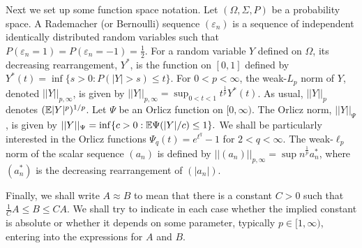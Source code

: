 Next we set up some function space notation. Let $(\Omega,\Sigma,P)$ be
a probability space. A Rademacher (or Bernoulli) sequence $(\varepsilon_n)$ is
a sequence of independent identically distributed random variables such that
$P(\varepsilon_n = 1)= P(\varepsilon_n = -1) = \frac12$. For a random variable
$Y$ defined on $\Omega$, its decreasing rearrangement, $Y^*$, is the function on
$[0,1]$ defined by $Y^*(t)= \inf \lbrace s>0 : P(|Y|>s) \le t \rbrace$.
For $0<p<\infty$, the weak-$L_p$ norm of $Y$, denoted $||Y||_{p,\infty}$, is
 given by
$||Y||_{p,\infty} = \sup_{0<t<1}t^{\frac 1p}Y^*(t)$. As usual, $||Y||_p$
denotes $(\Bbb E |Y|^p)^{1/p}$.
Let $\Psi$ be an Orlicz function on $[0,\infty)$. The Orlicz norm, $||Y||_\Psi$
, is given by $||Y||_\Psi = \inf \lbrace c>0: \Bbb E \Psi(|Y|/c) \le 1 \rbrace.$
 We shall be particularly interested in the Orlicz functions
 $\Psi_q(t)=e^{t^q}-1$ for $2<q<\infty$. The weak-$\ell_p$ norm of the scalar
 sequence $(a_n)$ is
defined by $||(a_n)||_{p,\infty}= \sup n^{\frac 1p} a^*_n$, where $(a_n^*)$
is the decreasing rearrangement of $(|a_n|)$.

Finally, we shall write $A\approx B$ to mean that there is a constant $C>0$ such
 that $\frac1C A \le B \le CA$.
We shall try to indicate in each case whether the implied constant is absolute
or whether it depends on some parameter, typically $p \in [1,\infty)$, entering
into the expressions for $A$ and $B$.

